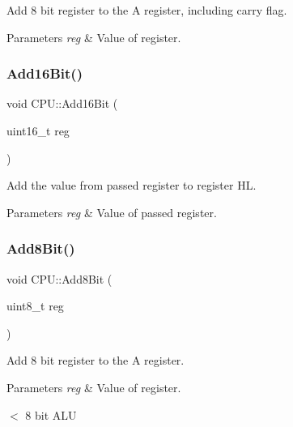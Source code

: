 Add 8 bit register to the A register, including carry flag. 


\begin{DoxyParams}{Parameters}
{\em reg} & Value of register. \\
\hline
\end{DoxyParams}
\mbox{\label{classCPU_aa5a7f8e66efea2e1071c6fbb0e088e1d}} 
\subsubsection{\texorpdfstring{Add16\+Bit()}{Add16Bit()}}
{\footnotesize\ttfamily void C\+P\+U\+::\+Add16\+Bit (\begin{DoxyParamCaption}\item[{uint16\+\_\+t}]{reg }\end{DoxyParamCaption})\hspace{0.3cm}{\ttfamily [private]}}



Add the value from passed register to register HL. 


\begin{DoxyParams}{Parameters}
{\em reg} & Value of passed register. \\
\hline
\end{DoxyParams}
\mbox{\label{classCPU_ab0be615e4d0440a927b3e3a95e378d3a}} 
\subsubsection{\texorpdfstring{Add8\+Bit()}{Add8Bit()}}
{\footnotesize\ttfamily void C\+P\+U\+::\+Add8\+Bit (\begin{DoxyParamCaption}\item[{uint8\+\_\+t}]{reg }\end{DoxyParamCaption})\hspace{0.3cm}{\ttfamily [private]}}



Add 8 bit register to the A register. 


\begin{DoxyParams}{Parameters}
{\em reg} & Value of register.\\
\hline
\end{DoxyParams}
$<$ 8 bit A\+LU \mbox{\label{classCPU_aca034a9f8f8a900b48acf54398cd67ef}} 
